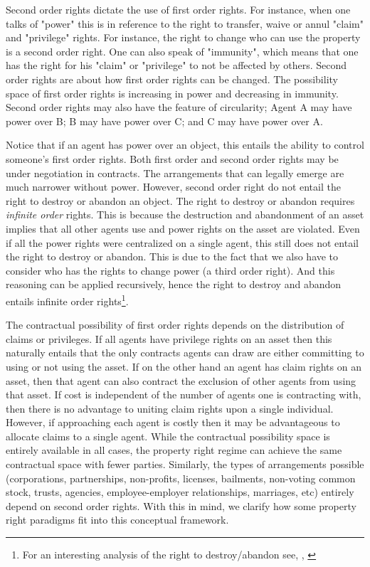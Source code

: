 Second order rights dictate the use of first order rights. For instance, when one talks of "power" this is in reference to the right to transfer, waive or annul "claim" and "privilege" rights. For instance, the right to change who can use the property is a second order right. One can also speak of "immunity", which means that one has the right for his "claim" or "privilege" to not be affected by others. Second order rights are about how first order rights can be changed. The possibility space of first order rights is increasing in power and decreasing in immunity. Second order rights may also have the feature of circularity; Agent A may have power over B; B may have power over C; and C may have power over A.

Notice that if an agent has power over an object, this entails the ability to control someone's first order rights. Both first order and second order rights may be under negotiation in contracts. The arrangements that can legally emerge are much narrower without power. However, second order right do not entail the right to destroy or abandon an object. The right to destroy or abandon requires \textit{infinite order} rights. This is because the destruction and abandonment of an asset implies that all other agents use and power rights on the asset are violated. Even if all the power rights were centralized on a single agent, this still does not entail the right to destroy or abandon. This is due to the fact that we also have to consider who has the rights to change power (a third order right). And this reasoning can be applied recursively, hence the right to destroy and abandon entails infinite order rights\footnote{For an interesting analysis of the right to destroy/abandon see, \cite{Strahilevitz2005}, \cite{Strahilevitz2009}}. 


The contractual possibility of first order rights depends on the distribution of claims or privileges. If all agents have privilege rights on an asset then this naturally entails that the only contracts agents can draw are either committing to using or not using the asset. If on the other hand an agent has claim rights on an asset, then that agent can also contract the exclusion of other agents from using that asset. If cost is independent of the number of agents one is contracting with, then there is no advantage to uniting claim rights upon a single individual. However, if approaching each agent is costly then it may be advantageous to allocate claims to a single agent. While the contractual possibility space is entirely available in all cases, the property right regime can achieve the same contractual space with fewer parties. Similarly, the types of arrangements possible (corporations, partnerships, non-profits, licenses, bailments, non-voting common stock, trusts, agencies, employee-employer relationships, marriages, etc) entirely depend on second order rights. With this in mind, we clarify how some property right paradigms fit into this conceptual framework.

